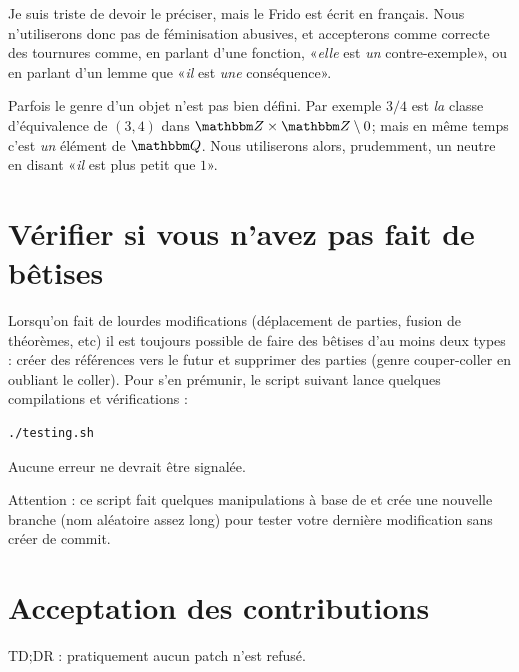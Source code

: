 Je suis triste de devoir le préciser, mais le Frido est écrit en français. Nous n'utiliserons donc pas de féminisation abusives, et accepterons comme correcte des tournures comme, en parlant d'une fonction, «\emph{elle} est \emph{un} contre-exemple», ou en parlant d'un lemme que «\emph{il} est \emph{une} conséquence».

Parfois le genre d'un objet n'est pas bien défini. Par exemple \( 3/4\) est \emph{la} classe d'équivalence de \( (3,4)\) dans \( \eZ\times \eZ\setminus{0}\); mais en même temps c'est \emph{un} élément de \( \eQ\). Nous utiliserons alors, prudemment, un neutre en disant «\emph{il} est plus petit que \( 1\)».


\section{Vérifier si vous n'avez pas fait de bêtises}

Lorsqu'on fait de lourdes modifications (déplacement de parties, fusion de théorèmes, etc) il est toujours possible de faire des bêtises d'au moins deux types : créer des références vers le futur et supprimer des parties (genre couper-coller en oubliant le coller). Pour s'en prémunir, le script suivant lance quelques compilations et vérifications :

\begin{verbatim}
./testing.sh
\end{verbatim}
Aucune erreur ne devrait être signalée.

Attention : ce script fait quelques manipulations à base de  et crée une nouvelle branche (nom aléatoire assez long) pour tester votre dernière modification sans créer de commit.

\section{Acceptation des contributions}

TD;DR : pratiquement aucun patch n'est refusé.

